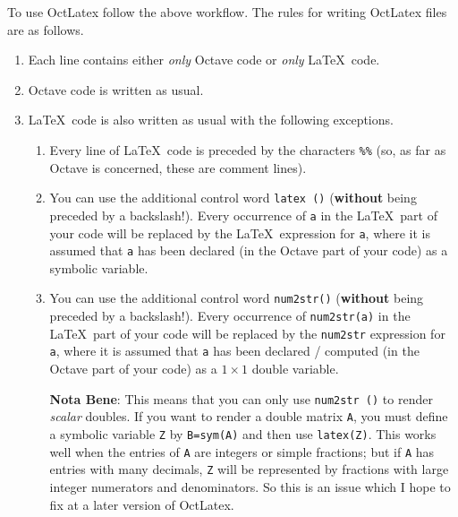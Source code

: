 \documentclass{article}
\begin{document}
 \noindent To use \textsf{OctLatex} follow the above  workflow.
 The rules for writing \textsf{OctLatex} files are as follows.
 \begin{enumerate}
 \item Each line contains either \emph{only} \textsf{Octave} code  or \emph{only} \LaTeX\ code. 
 \item \textsf{Octave} code is written as usual.
 \item \LaTeX\ code is also written as usual with the following exceptions. 
 \begin{enumerate}
 \item Every line of \LaTeX\ code is preceded by the characters \texttt{\%\%} 
 (so, as far as \textsf{Octave} is concerned, these
 are comment lines).
 \item You can use the additional control word \texttt{latex (\;)} (\textbf{without} being preceded by a backslash!). 
 Every occurrence of \texttt{a} in the \LaTeX\  part of your code will be replaced 
 by the \LaTeX\  expression for \texttt{a},
 where it is assumed that \texttt{a} has been declared (in the \textsf{Octave} part of your code) as a symbolic variable.
 \item You can use the additional control word \texttt{num2str(\;)} (\textbf{without} being preceded by a backslash!).
 Every occurrence of \texttt{num2str(a)} in the \LaTeX\ part of your code will 
 be replaced by the \texttt{num2str}  expression for  \texttt{a},
 where it is assumed that \texttt{a} has been declared / computed (in the \textsf{Octave} part of your code) 
 as a $1\times 1$ double variable. 

 \medskip 
 
 \noindent\textbf{Nota Bene}:
 This means that you can only use \texttt{num2str (\;)} to render \emph{scalar} doubles. If you want 
 to render a double matrix \texttt{A},
 you must define a symbolic variable \texttt{Z} by \texttt{B=sym(A)} and then use \texttt{latex(Z)}. This works well when 
 the entries of \texttt{A} are integers or simple fractions; but if \texttt{A} has entries with many decimals,
 \texttt{Z}  will be represented by fractions with large integer numerators and denominators. So this 
 is an issue which I hope to fix at a later version of \textsf{OctLatex}.

 \end{enumerate}  
 \end{enumerate}  
\end{document}
